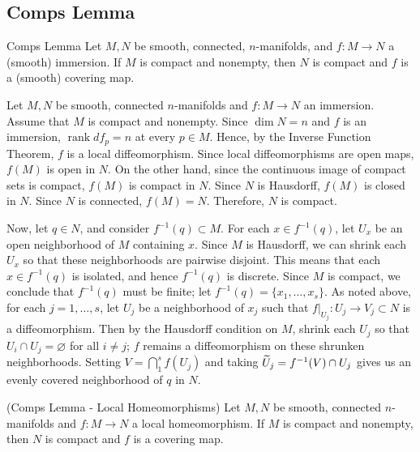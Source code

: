 \documentclass{article}
\begin{document}
\subsection{Comps Lemma}
\begin{prb}{Comps Lemma}
	Let $M, N$ be smooth, connected, $n$-manifolds, and $f: M \to N$ a (smooth) immersion. If $M$ is compact and nonempty, then $N$ is compact and $f$ is a (smooth) covering map. 
\end{prb}
\begin{solutions}
	Let $M, N$ be smooth, connected $n$-manifolds and $f: M \to N$ an immersion. Assume that $M$ is compact and nonempty. Since $\operatorname{dim}{N} = n$ and $f$ is an immersion, $\operatorname{rank}{df_{p}} = n$ at every $p \in M$. Hence, by the Inverse Function Theorem, $f$ is a local diffeomorphism. Since local diffeomorphisms are open maps, $f(M)$ is open in $N$. On the other hand, since the continuous image of compact sets is compact, $f(M)$ is compact in $N$. Since $N$ is Hausdorff, $f(M)$ is closed in $N$. Since $N$ is connected, $f(M) = N$. Therefore, $N$ is compact. 
	
	Now, let $q \in N$, and consider $f^{-1}(q) \subset M$. For each $x \in f^{-1}(q)$, let $U_{x}$ be an open neighborhood of $M$ containing $x$. Since $M$ is Hausdorff, we can shrink each $U_{x}$ so that these neighborhoods are pairwise disjoint. This means that each $x \in f^{-1}(q)$ is isolated, and hence $f^{-1}(q)$ is discrete. Since $M$ is compact, we conclude that $f^{-1}(q)$ must be finite; let $f^{-1}(q) = \{x_{1}, \ldots, x_{s}\}$. As noted above, for each $j = 1, \ldots, s$, let $U_{j}$ be a neighborhood of $x_{j}$ such that $f|_{U_{j}}: U_{j} \to V_{j} \subset N$ is a diffeomorphism. Then by the Hausdorff condition on $M$, shrink each $U_{j}$ so that $U_{i}\cap U_{j} = \varnothing$ for all $i \neq j$; $f$ remains a diffeomorphism on these shrunken neighborhoods. Setting $V = \bigcap_{1}^{s}f(U_{j})$ and taking $\widetilde{U}_{j} = f^{-1}(V) \cap U_{j}$ gives us an evenly covered neighborhood of $q$ in $N$. 
\end{solutions}

\begin{prb}{(Comps Lemma - Local Homeomorphisms)}
	Let $M, N$ be smooth, connected $n$-manifolds and $f: M \to N$ a local homeomorphism. If $M$ is compact and nonempty, then $N$ is compact and $f$ is a covering map. 
\end{prb}
\end{document}
